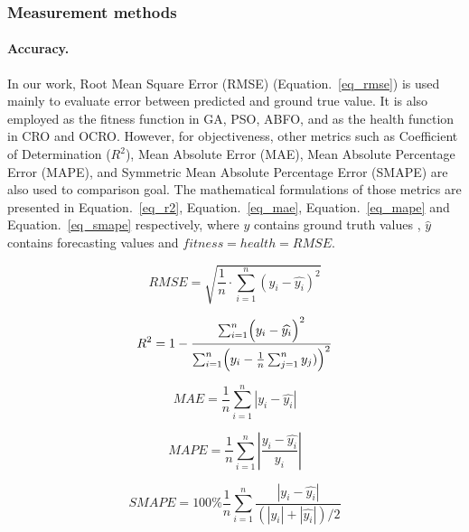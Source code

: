 \documentclass[11pt,twoside]{article}
\begin{document}
\begin{multicols}{2}
\subsubsection{Measurement methods}
\label{measurement_methods}

\paragraph{\textbf{Accuracy.}} In our work, Root Mean Square Error (RMSE) (Equation.~\ref{eq_rmse}) is used mainly to evaluate error between predicted and ground true value. It is also employed as the fitness function in GA, PSO, ABFO, and as the health function in CRO and OCRO. However, for objectiveness, other metrics such as Coefficient of Determination ($R^2$), Mean Absolute Error (MAE), Mean Absolute Percentage Error (MAPE), and Symmetric Mean Absolute Percentage Error (SMAPE) are also used to comparison goal. The mathematical formulations of those metrics are presented in Equation.~\ref{eq_r2}, Equation.~\ref{eq_mae}, Equation.~\ref{eq_mape} and Equation.~\ref{eq_smape} respectively, where $y$ contains ground truth values , $\widehat{y}$ contains forecasting values and $fitness = health = RMSE$.

\begin{equation} \label{eq_rmse}
RMSE  = \sqrt { \frac{1}{n} \cdot \sum_{i=1}^n (y_i - \widehat{y_i})^2  } 
\end{equation}

\begin{equation} \label{eq_r2}
R^2  = 1 - \displaystyle \frac{ \sum_{i=1}^n \Bigl( y_i - \widehat{y_i} \Bigr)^2} {\sum_{i=1}^n \Bigl( y_i  - \frac{1}{n} \sum_{j=1}^n y_j) \Bigr)^2  } 
\end{equation}

\begin{equation} \label{eq_mae}
MAE = \frac{1}{n} \sum_{i=1}^n |y_i - \widehat{y_i}|
\end{equation}

\begin{equation} \label{eq_mape}
MAPE  = \frac{1}{n} \sum_{i=1}^n \left \lvert  \frac{y_i  - \widehat{y_i}} {y_i} \right\rvert 
\end{equation}

\begin{equation} \label{eq_smape}
SMAPE  = 100\% \frac{1}{n} \sum_{i=1}^n \frac{ |y_i - \widehat{y_i} | }{ (|y_i| + |\widehat{y_i}|)/2  }
\end{equation}
\normalsize


\end{multicols}
\end{document}
